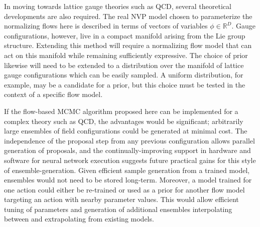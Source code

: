 In moving towards lattice gauge theories such as QCD, several theoretical developments are also required. The real NVP model chosen to parameterize the normalizing flows here is described in terms of vectors of variables $\phi \in \mathbb{R}^D$. Gauge configurations, however, live in a compact manifold arising from the Lie group structure. Extending this method will require a normalizing flow model that can act on this manifold while remaining sufficiently expressive. The choice of prior likewise will need to be extended to a distribution over the manifold of lattice gauge configurations which can be easily sampled. A uniform distribution, for example, may be a candidate for a prior, but this choice must be tested in the context of a specific flow model.

If the flow-based MCMC algorithm proposed here can be implemented for a complex theory such as QCD, the advantages would be significant; arbitrarily large ensembles of field configurations could be generated at minimal cost. The independence of the proposal step from any previous configuration allows parallel generation of proposals, and the continually-improving support in hardware and software for neural network execution suggests future practical gains for this style of ensemble-generation. Given efficient sample generation from a trained model, ensembles would not need to be stored long-term. Moreover, a model trained for one action could either be re-trained or used as a prior for another flow model targeting an action with nearby parameter values. This would allow efficient tuning of parameters and generation of additional ensembles interpolating between and extrapolating from existing models.
